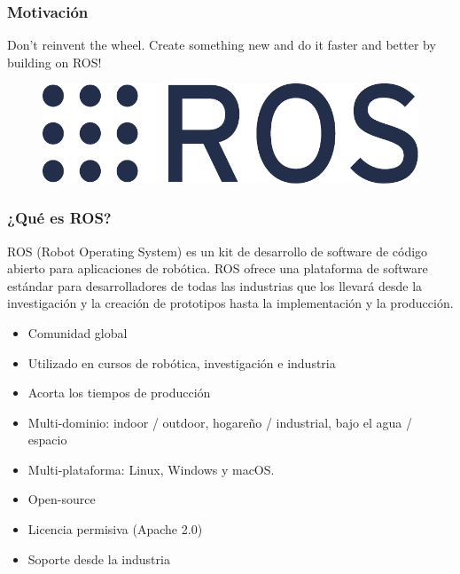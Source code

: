 \begin{frame}
	\frametitle{Motivación}
	
	Don't reinvent the wheel. Create something new and do it faster and better by building on ROS!
	
	
	
	
	

    \vspace*{1cm}
    \begin{figure}
        \includegraphics[width=0.5\columnwidth]{images/ros_logo.pdf}
    \end{figure}
	
\end{frame}

\begin{frame}
	\frametitle{¿Qué es ROS?}
	
	ROS (Robot Operating System) es un kit de desarrollo de software de código abierto para aplicaciones de robótica. ROS ofrece una plataforma de software estándar para desarrolladores de todas las industrias que los llevará desde la investigación y la creación de prototipos hasta la implementación y la producción.
	
	\begin{itemize}
		\item Comunidad global
		\item Utilizado en cursos de robótica, investigación e industria
		\item Acorta los tiempos de producción
		\item Multi-dominio: indoor / outdoor, hogareño / industrial, bajo el agua / espacio
		\item Multi-plataforma: Linux, Windows y macOS.
		\item Open-source
		\item Licencia permisiva (Apache 2.0)
		\item Soporte desde la industria
	\end{itemize}
	
	
	
	
\end{frame}

